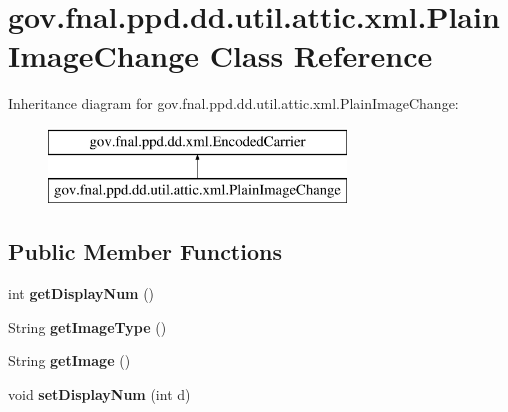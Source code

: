 \hypertarget{classgov_1_1fnal_1_1ppd_1_1dd_1_1util_1_1attic_1_1xml_1_1PlainImageChange}{\section{gov.\-fnal.\-ppd.\-dd.\-util.\-attic.\-xml.\-Plain\-Image\-Change Class Reference}
\label{classgov_1_1fnal_1_1ppd_1_1dd_1_1util_1_1attic_1_1xml_1_1PlainImageChange}
}
Inheritance diagram for gov.\-fnal.\-ppd.\-dd.\-util.\-attic.\-xml.\-Plain\-Image\-Change\-:\begin{figure}[H]
\begin{center}
\leavevmode
\includegraphics[height=2.000000cm]{classgov_1_1fnal_1_1ppd_1_1dd_1_1util_1_1attic_1_1xml_1_1PlainImageChange}
\end{center}
\end{figure}
\subsection*{Public Member Functions}
\begin{DoxyCompactItemize}
\item 
\hypertarget{classgov_1_1fnal_1_1ppd_1_1dd_1_1util_1_1attic_1_1xml_1_1PlainImageChange_ab2e377fdcad4d16d0d1f76d40fdc5d1f}{int {\bfseries get\-Display\-Num} ()}\label{classgov_1_1fnal_1_1ppd_1_1dd_1_1util_1_1attic_1_1xml_1_1PlainImageChange_ab2e377fdcad4d16d0d1f76d40fdc5d1f}

\item 
\hypertarget{classgov_1_1fnal_1_1ppd_1_1dd_1_1util_1_1attic_1_1xml_1_1PlainImageChange_a51c6110dc464d8f3c240d505fb90c762}{String {\bfseries get\-Image\-Type} ()}\label{classgov_1_1fnal_1_1ppd_1_1dd_1_1util_1_1attic_1_1xml_1_1PlainImageChange_a51c6110dc464d8f3c240d505fb90c762}

\item 
\hypertarget{classgov_1_1fnal_1_1ppd_1_1dd_1_1util_1_1attic_1_1xml_1_1PlainImageChange_afccf8789d3103ede8d09ffd955e296f3}{String {\bfseries get\-Image} ()}\label{classgov_1_1fnal_1_1ppd_1_1dd_1_1util_1_1attic_1_1xml_1_1PlainImageChange_afccf8789d3103ede8d09ffd955e296f3}

\item 
\hypertarget{classgov_1_1fnal_1_1ppd_1_1dd_1_1util_1_1attic_1_1xml_1_1PlainImageChange_a1a89d768d4ed66421b6d44ab61e85b4b}{void {\bfseries set\-Display\-Num} (int d)}\label{classgov_1_1fnal_1_1ppd_1_1dd_1_1util_1_1attic_1_1xml_1_1PlainImageChange_a1a89d768d4ed66421b6d44ab61e85b4b}

\end{DoxyCompactItemize}
